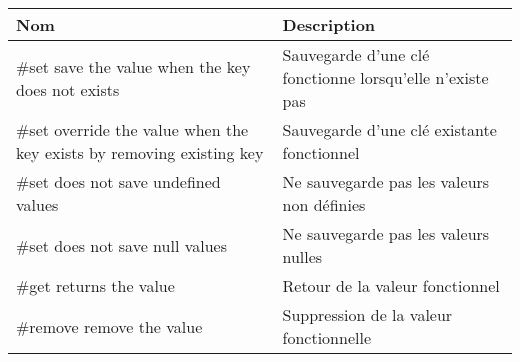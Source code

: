 \begin{tabular}{P{0.3\textwidth}P{0.6\textwidth}}
\hline
\bf Nom
&
\bf Description
\\
\hline
\hline
\#set save the value when the key does not exists
&
Sauvegarde d'une clé fonctionne lorsqu'elle n'existe pas
\\
\#set override the value when the key exists by removing existing key
&
Sauvegarde d'une clé existante fonctionnel
\\
\#set does not save undefined values
&
Ne sauvegarde pas les valeurs non définies
\\
\#set does not save null values
&
Ne sauvegarde pas les valeurs nulles
\\
\#get returns the value
&
Retour de la valeur fonctionnel
\\
\#remove remove the value
&
Suppression de la valeur fonctionnelle
\\
\hline
\end{tabular}
